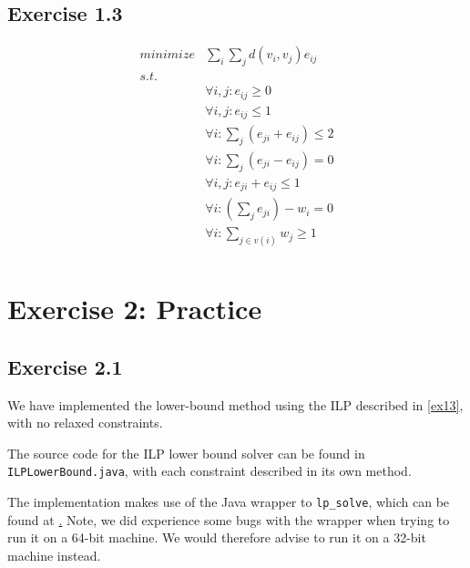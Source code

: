 \documentclass[11pt,a4paper]{article}
\begin{document}
\subsection{Exercise 1.3}
\label{ex13}
\begin{align*}
    minimize & \sum_i \sum_j d(v_i, v_j) e_{ij} \\
    s.t.     & \\
             & \forall i, j: e_{ij} \geq 0 \\
             & \forall i, j: e_{ij} \leq 1 \\
             & \forall i: \sum_j (e_{ji} + e_{ij}) \leq 2 \\
             & \forall i: \sum_j (e_{ji} - e_{ij}) = 0 \\
             & \forall i,j: e_{ji} + e_{ij} \leq 1 \\
             & \forall i: (\sum_j e_{ji}) - w_i = 0 \\
             & \forall i: \sum_{j \in v(i)} w_j \geq 1 \\
\end{align*}

\section{Exercise 2: Practice}

\subsection{Exercise 2.1}
We have implemented the lower-bound method using the ILP described in \autoref{ex13},
with no relaxed constraints.

The source code for the ILP lower bound solver can be found in \texttt{ILPLowerBound.java},
with each constraint described in its own method.

The implementation makes use of the Java wrapper to \texttt{lp\_solve}, which
can be found at \href{http://lpsolve.sourceforge.net/5.5/Java/README.html}.
Note, we did experience some bugs with the wrapper when trying to run it on a
64-bit machine. We would therefore advise to run it on a 32-bit machine instead.
\end{document}
